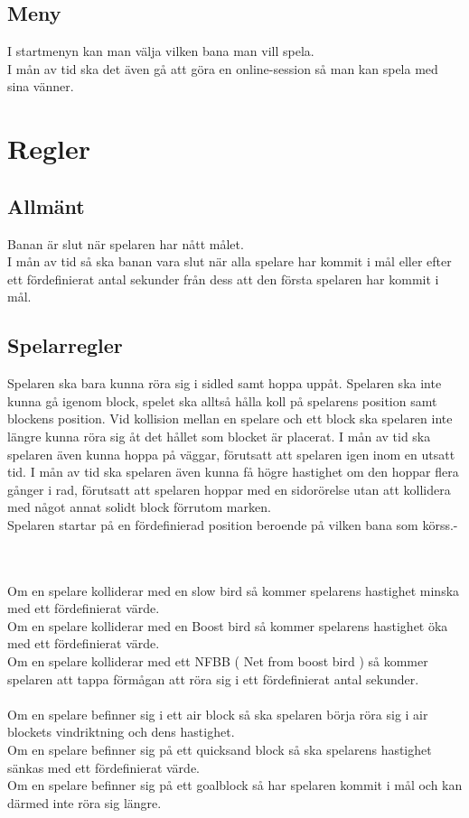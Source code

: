 \documentclass{TDP003mall}
\begin{document}
\subsection{Meny}
I startmenyn kan man välja vilken bana man vill spela. \\
I mån av tid ska det även gå att göra en online-session så man kan spela med sina vänner.

\section{Regler}

\subsection{Allmänt}
Banan är slut när spelaren har nått målet. \\
I mån av tid så ska banan vara slut när alla spelare har kommit i mål eller efter ett fördefinierat antal sekunder från dess att den första spelaren har kommit i mål.

\subsection{Spelarregler}
Spelaren ska bara kunna röra sig i sidled samt hoppa uppåt. Spelaren ska inte kunna gå igenom block, spelet ska alltså hålla koll på spelarens position samt blockens position. Vid kollision mellan en spelare och ett block ska spelaren inte längre kunna röra sig åt det hållet som blocket är placerat. \newline
I mån av tid ska spelaren även kunna hoppa på väggar, förutsatt att spelaren igen inom en utsatt tid.
I mån av tid ska spelaren även kunna få högre hastighet om den hoppar flera gånger i rad, förutsatt att spelaren hoppar med en sidorörelse utan att kollidera med något annat solidt block förrutom marken. \newline
\\
Spelaren startar på en fördefinierad position beroende på vilken bana som körss.-

\\\\
Om en spelare kolliderar med en slow bird så kommer spelarens hastighet minska med ett fördefinierat värde. \\
Om en spelare kolliderar med en Boost bird så kommer spelarens hastighet öka med ett fördefinierat värde. \\
Om en spelare kolliderar med ett NFBB ( Net from boost bird ) så kommer spelaren att tappa förmågan att röra sig i ett fördefinierat antal sekunder.
\\\\
Om en spelare befinner sig i ett air block så ska spelaren börja röra sig i air blockets vindriktning och dens hastighet. \\
Om en spelare befinner sig på ett quicksand block så ska spelarens hastighet sänkas med ett fördefinierat värde. \\
Om en spelare befinner sig på ett goalblock så har spelaren kommit i mål och kan därmed inte röra sig längre.
\end{document}
